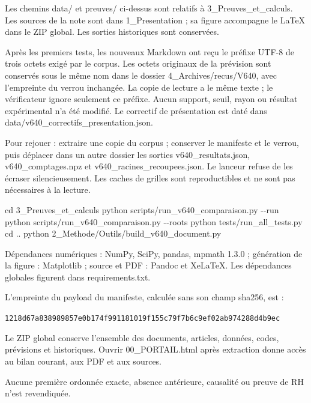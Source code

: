 \documentclass[
  10pt,
  a4paper,
]{article}
\newenvironment{Shaded}{}{}
\newcommand{\AttributeTok}[1]{\textcolor[rgb]{0.49,0.56,0.16}{#1}}
\newcommand{\BuiltInTok}[1]{\textcolor[rgb]{0.00,0.50,0.00}{#1}}
\newcommand{\ExtensionTok}[1]{#1}
\newcommand{\NormalTok}[1]{#1}
\begin{document}
Les chemins data/ et preuves/ ci-dessus sont relatifs à
3\_Preuves\_et\_calculs. Les sources de la note sont dans
1\_Presentation ; sa figure accompagne le LaTeX dans le ZIP global. Les
sorties historiques sont conservées.

Après les premiers tests, les nouveaux Markdown ont reçu le préfixe
UTF-8 de trois octets exigé par le corpus. Les octets originaux de la
prévision sont conservés sous le même nom dans le dossier
4\_Archives/recus/V640, avec l'empreinte du verrou inchangée. La copie
de lecture a le même texte ; le vérificateur ignore seulement ce
préfixe. Aucun support, seuil, rayon ou résultat expérimental n'a été
modifié. Le correctif de présentation est daté dans
data/v640\_correctifs\_presentation.json.

Pour rejouer : extraire une copie du corpus ; conserver le manifeste et
le verrou, puis déplacer dans un autre dossier les sorties
v640\_resultats.json, v640\_comptages.npz et
v640\_racines\_recoupees.json. Le lanceur refuse de les écraser
silencieusement. Les caches de grilles sont reproductibles et ne sont
pas nécessaires à la lecture.

\begin{Shaded}
\begin{Highlighting}[]
\BuiltInTok{cd}\NormalTok{ 3\_Preuves\_et\_calculs}
\ExtensionTok{python}\NormalTok{ scripts/run\_v640\_comparaison.py }\AttributeTok{{-}{-}run}
\ExtensionTok{python}\NormalTok{ scripts/run\_v640\_comparaison.py }\AttributeTok{{-}{-}roots}
\ExtensionTok{python}\NormalTok{ tests/run\_all\_tests.py}
\BuiltInTok{cd}\NormalTok{ ..}
\ExtensionTok{python}\NormalTok{ 2\_Methode/Outils/build\_v640\_document.py}
\end{Highlighting}
\end{Shaded}

Dépendances numériques : NumPy, SciPy, pandas, mpmath 1.3.0 ; génération
de la figure : Matplotlib ; source et PDF : Pandoc et XeLaTeX. Les
dépendances globales figurent dans requirements.txt.

L'empreinte du payload du manifeste, calculée sans son champ sha256, est
:

\texttt{1218d67a838989857e0b174f991181019f155c79f7b6c9ef02ab974288d4b9ec}

Le ZIP global conserve l'ensemble des documents, articles, données,
codes, prévisions et historiques. Ouvrir 00\_PORTAIL.html après
extraction donne accès au bilan courant, aux PDF et aux sources.

Aucune première ordonnée exacte, absence antérieure, causalité ou preuve
de RH n'est revendiquée.
\end{document}
